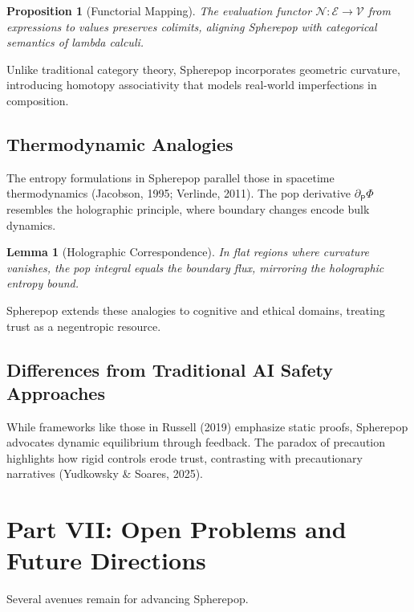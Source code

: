 \documentclass[12pt]{article}
\newtheorem{proposition}{Proposition}
\newtheorem{lemma}{Lemma}
\begin{document}
\begin{proposition}[Functorial Mapping]
The evaluation functor \(\mathcal{N}: \mathcal{E} \to \mathcal{V}\) from expressions to values preserves colimits, aligning Spherepop with categorical semantics of lambda calculi.
\end{proposition}

Unlike traditional category theory, Spherepop incorporates geometric curvature, introducing homotopy associativity that models real-world imperfections in composition.

\subsection{Thermodynamic Analogies}
The entropy formulations in Spherepop parallel those in spacetime thermodynamics (Jacobson, 1995; Verlinde, 2011). The pop derivative \(\partial_{\mathsf{P}}\Phi\) resembles the holographic principle, where boundary changes encode bulk dynamics.

\begin{lemma}[Holographic Correspondence]
In flat regions where curvature vanishes, the pop integral equals the boundary flux, mirroring the holographic entropy bound.
\end{lemma}

Spherepop extends these analogies to cognitive and ethical domains, treating trust as a negentropic resource.

\subsection{Differences from Traditional AI Safety Approaches}
While frameworks like those in Russell (2019) emphasize static proofs, Spherepop advocates dynamic equilibrium through feedback. The paradox of precaution highlights how rigid controls erode trust, contrasting with precautionary narratives (Yudkowsky \& Soares, 2025).

\section*{Part VII: Open Problems and Future Directions}

Several avenues remain for advancing Spherepop.
\end{document}
